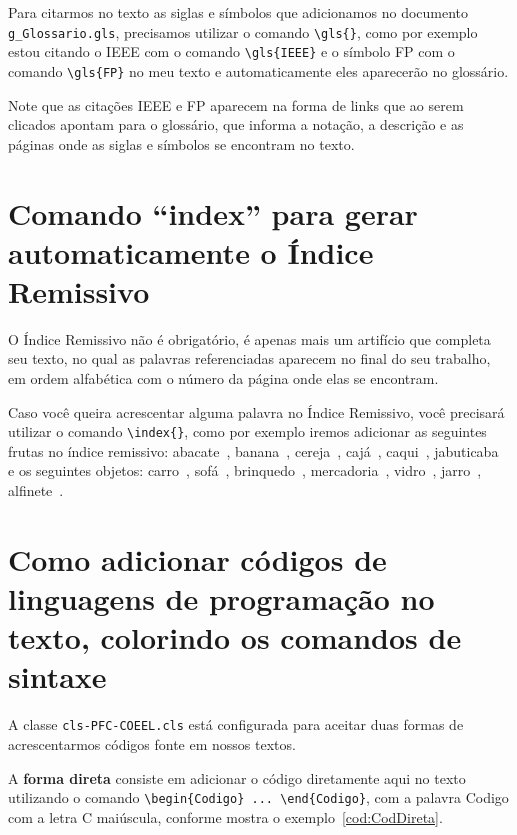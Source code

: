 Para citarmos no texto as siglas e símbolos que adicionamos no documento \verb|g_Glossario.gls|, precisamos utilizar o comando \verb|\gls{}|, como por exemplo estou citando o \gls{IEEE} com o comando \verb|\gls{IEEE}| e o símbolo \gls{FP} com o comando \verb|\gls{FP}| no meu texto e automaticamente eles aparecerão no glossário. 

Note que as citações \gls{IEEE} e \gls{FP} aparecem na forma de links que ao serem clicados apontam para o glossário, que informa a notação, a descrição e as páginas onde as siglas e símbolos se encontram no texto.


\section{Comando ``index'' para gerar automaticamente o Índice Remissivo}

O Índice Remissivo não é obrigatório, é apenas mais um artifício que completa seu texto, no qual as palavras referenciadas aparecem no final do seu trabalho, em ordem alfabética com o número da página onde elas se encontram.

Caso você queira acrescentar alguma palavra no Índice Remissivo, você precisará utilizar o comando \verb|\index{}|, como por exemplo iremos adicionar as seguintes frutas no índice remissivo: abacate~, banana~, cereja~, cajá~, caqui~, jabuticaba~ e os seguintes objetos: carro~, sofá~, brinquedo~, mercadoria~, vidro~, jarro~, alfinete~.

\newpage\clearpage\pagebreak

\section{Como adicionar códigos de linguagens de programação no texto, colorindo os comandos de sintaxe}

A classe \verb|cls-PFC-COEEL.cls| está configurada para aceitar duas formas de acrescentarmos códigos fonte em nossos textos.

A {\bf forma direta} consiste em adicionar o código diretamente aqui no texto utilizando o comando \verb|\begin{Codigo} ... \end{Codigo}|, com a palavra Codigo com a letra C maiúscula, conforme mostra o exemplo~\ref{cod:CodDireta}.

